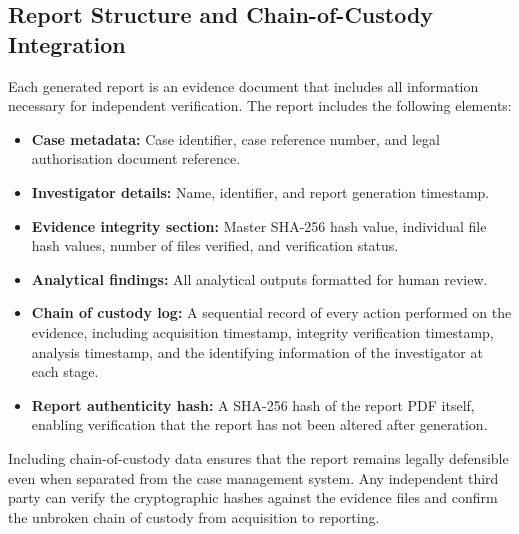 \documentclass[12pt,a4paper]{report}
\begin{document}

\subsection{Report Structure and Chain-of-Custody Integration}

Each generated report is an evidence document that includes all information necessary for independent verification. The report includes the following elements:

\begin{itemize}
    \item \textbf{Case metadata:} Case identifier, case reference number, and legal authorisation document reference.
    \item \textbf{Investigator details:} Name, identifier, and report generation timestamp.
    \item \textbf{Evidence integrity section:} Master SHA-256 hash value, individual file hash values, number of files verified, and verification status.
    \item \textbf{Analytical findings:} All analytical outputs formatted for human review.
    \item \textbf{Chain of custody log:} A sequential record of every action performed on the evidence, including acquisition timestamp, integrity verification timestamp, analysis timestamp, and the identifying information of the investigator at each stage.
    \item \textbf{Report authenticity hash:} A SHA-256 hash of the report PDF itself, enabling verification that the report has not been altered after generation.
\end{itemize}

Including chain-of-custody data ensures that the report remains legally defensible even when separated from the case management system. Any independent third party can verify the cryptographic hashes against the evidence files and confirm the unbroken chain of custody from acquisition to reporting.

\end{document}
